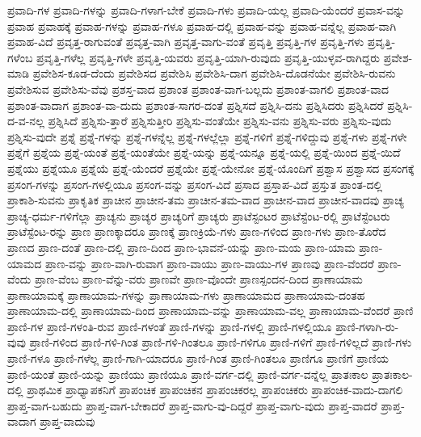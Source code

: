 {ಪ್ರವಾದಿ-ಗಳ
ಪ್ರವಾದಿ-ಗಳನ್ನು
ಪ್ರವಾದಿ-ಗಳಾಗ-ಬೇಕೆ
ಪ್ರವಾದಿ-ಗಳು
ಪ್ರವಾದಿ-ಯಲ್ಲ
ಪ್ರವಾದಿ-ಯೆಂದರೆ
ಪ್ರವಾಸ-ವನ್ನು
ಪ್ರವಾಹ
ಪ್ರವಾಹಕ್ಕೆ
ಪ್ರವಾಹ-ಗಳನ್ನು
ಪ್ರವಾಹ-ಗಳೂ
ಪ್ರವಾಹ-ದಲ್ಲಿ
ಪ್ರವಾಹ-ವನ್ನು
ಪ್ರವಾಹ-ವನ್ನೆಲ್ಲ
ಪ್ರವಾಹ-ವಾಗಿ
ಪ್ರವಾಹ-ವಿದೆ
ಪ್ರವೃತ್ತ-ರಾಗುವಂತೆ
ಪ್ರವೃತ್ತ-ವಾಗಿ
ಪ್ರವೃತ್ತ-ವಾಗು-ವಂತೆ
ಪ್ರವೃತ್ತಿ
ಪ್ರವೃತ್ತಿ-ಗಳ
ಪ್ರವೃತ್ತಿ-ಗಳು
ಪ್ರವೃತ್ತಿ-ಗಳೆಂಬ
ಪ್ರವೃತ್ತಿ-ಗಳೆಲ್ಲ
ಪ್ರವೃತ್ತಿ-ಗಳೇ
ಪ್ರವೃತ್ತಿ-ಯವರು
ಪ್ರವೃತ್ತಿ-ಯಾಗಿ-ರುವುದು
ಪ್ರವೃತ್ತಿ-ಯುಳ್ಳವ-ರಾಗಿದ್ದರು
ಪ್ರವೇಶ-ಮಾಡಿ
ಪ್ರವೇಶಿಸ-ಕೂಡ-ದೆಂದು
ಪ್ರವೇಶಿಸದ
ಪ್ರವೇಶಿಸಿ
ಪ್ರವೇಶಿಸಿ-ದಾಗ
ಪ್ರವೇಶಿಸಿ-ದೊಡನೆಯೇ
ಪ್ರವೇಶಿಸಿ-ರುವನು
ಪ್ರವೇಶಿಸುವ
ಪ್ರವೇಶಿಸು-ವೆವು
ಪ್ರಶಸ್ತ-ವಾದ
ಪ್ರಶಾಂತ
ಪ್ರಶಾಂತ-ವಾಗ-ಬಲ್ಲದು
ಪ್ರಶಾಂತ-ವಾಗಲಿ
ಪ್ರಶಾಂತ-ವಾದ
ಪ್ರಶಾಂತ-ವಾದಾಗ
ಪ್ರಶಾಂತ-ವಾ-ದುದು
ಪ್ರಶಾಂತ-ಸಾಗರ-ದಂತೆ
ಪ್ರಶ್ನಿಸದೆ
ಪ್ರಶ್ನಿಸಿ-ದನು
ಪ್ರಶ್ನಿಸಿದರು
ಪ್ರಶ್ನಿಸಿದರೆ
ಪ್ರಶ್ನಿಸಿ-ದ-ವ-ನಲ್ಲ
ಪ್ರಶ್ನಿಸಿದೆ
ಪ್ರಶ್ನಿಸು-ತ್ತಾರೆ
ಪ್ರಶ್ನಿಸುತ್ತೀರಿ
ಪ್ರಶ್ನಿಸು-ವಂತೆಯೇ
ಪ್ರಶ್ನಿಸು-ವನು
ಪ್ರಶ್ನಿಸು-ವರು
ಪ್ರಶ್ನಿಸು-ವುದು
ಪ್ರಶ್ನಿಸು-ವುದೇ
ಪ್ರಶ್ನೆ
ಪ್ರಶ್ನೆ-ಗಳನ್ನು
ಪ್ರಶ್ನೆ-ಗಳನ್ನೆಲ್ಲ
ಪ್ರಶ್ನೆ-ಗಳಲ್ಲೆಲ್ಲಾ
ಪ್ರಶ್ನೆ-ಗಳಿಗೆ
ಪ್ರಶ್ನೆ-ಗಳಿದ್ದುವು
ಪ್ರಶ್ನೆ-ಗಳು
ಪ್ರಶ್ನೆ-ಗಳೇ
ಪ್ರಶ್ನೆಗೆ
ಪ್ರಶ್ನೆಯ
ಪ್ರಶ್ನೆ-ಯಂತೆ
ಪ್ರಶ್ನೆ-ಯಂತೆಯೇ
ಪ್ರಶ್ನೆ-ಯನ್ನು
ಪ್ರಶ್ನೆ-ಯನ್ನೂ
ಪ್ರಶ್ನೆ-ಯಲ್ಲಿ
ಪ್ರಶ್ನೆ-ಯಿಂದ
ಪ್ರಶ್ನೆ-ಯಿದೆ
ಪ್ರಶ್ನೆಯು
ಪ್ರಶ್ನೆಯೂ
ಪ್ರಶ್ನೆಯೆ
ಪ್ರಶ್ನೆ-ಯೆಂದರೆ
ಪ್ರಶ್ನೆಯೇ
ಪ್ರಶ್ನೆ-ಯೇನೋ
ಪ್ರಶ್ನೆ-ಯೊಂದಿಗೆ
ಪ್ರಶ್ವಾಸ
ಪ್ರಶ್ವಾಸದ
ಪ್ರಸಂಗಕ್ಕೆ
ಪ್ರಸಂಗ-ಗಳನ್ನು
ಪ್ರಸಂಗ-ಗಳಲ್ಲಿಯೂ
ಪ್ರಸಂಗ-ವನ್ನು
ಪ್ರಸಂಗ-ವಿದೆ
ಪ್ರಸಾದ
ಪ್ರಸ್ತಾಪ-ವಿದೆ
ಪ್ರಸ್ತುತ
ಪ್ರಾಂತ-ದಲ್ಲಿ
ಪ್ರಾಕಾಶಿ-ಸುವನು
ಪ್ರಾಕೃತಿಕ
ಪ್ರಾಚೀನ
ಪ್ರಾಚೀನ-ತಮ
ಪ್ರಾಚೀನ-ತಮ-ವಾದ
ಪ್ರಾಚೀನ-ವಾದ
ಪ್ರಾಚೀನ-ವಾದವು
ಪ್ರಾಚ್ಯ
ಪ್ರಾಚ್ಯ-ಧರ್ಮ-ಗಳಿಗೆಲ್ಲಾ
ಪ್ರಾಚ್ಯನು
ಪ್ರಾಚ್ಯರ
ಪ್ರಾಚ್ಯರಿಗೆ
ಪ್ರಾಚ್ಯರು
ಪ್ರಾಟೆಸ್ಟಂಟರ
ಪ್ರಾಟೆಸ್ಟೆಂಟ-ರಲ್ಲಿ
ಪ್ರಾಟೆಸ್ಟೆಂಟರು
ಪ್ರಾಟೆಸ್ಟೆಂಟ-ರನ್ನು
ಪ್ರಾಣ
ಪ್ರಾಣಕ್ಕಾದರೂ
ಪ್ರಾಣಕ್ಕೆ
ಪ್ರಾಣಕ್ರಿಯೆ-ಗಳು
ಪ್ರಾಣ-ಗಳಿಂದ
ಪ್ರಾಣ-ಗಳು
ಪ್ರಾಣ-ತೊರೆದ
ಪ್ರಾಣದ
ಪ್ರಾಣ-ದಂತೆ
ಪ್ರಾಣ-ದಲ್ಲಿ
ಪ್ರಾಣ-ದಿಂದ
ಪ್ರಾಣ-ಭಾವನೆ-ಯನ್ನು
ಪ್ರಾಣ-ಮಯ
ಪ್ರಾಣ-ಯಾಮ
ಪ್ರಾಣ-ಯಾಮದ
ಪ್ರಾಣ-ವನ್ನು
ಪ್ರಾಣ-ವಾಗಿ-ರುವಾಗ
ಪ್ರಾಣ-ವಾಯು
ಪ್ರಾಣ-ವಾಯು-ಗಳ
ಪ್ರಾಣವು
ಪ್ರಾಣ-ವೆಂದರೆ
ಪ್ರಾಣ-ವೆಂದು
ಪ್ರಾಣ-ವೆಂಬ
ಪ್ರಾಣ-ವೆನ್ನು-ವರು
ಪ್ರಾಣವೇ
ಪ್ರಾಣ-ವೊಂದೇ
ಪ್ರಾಣಸ್ಪಂದನ-ದಿಂದ
ಪ್ರಾಣಾಯಾಮ
ಪ್ರಾಣಾಯಾಮಕ್ಕೆ
ಪ್ರಾಣಾಯಾಮ-ಗಳನ್ನು
ಪ್ರಾಣಾಯಾಮ-ಗಳು
ಪ್ರಾಣಾಯಾಮದ
ಪ್ರಾಣಾಯಾಮ-ದಂತಹ
ಪ್ರಾಣಾಯಾಮ-ದಲ್ಲಿ
ಪ್ರಾಣಾಯಾಮ-ದಿಂದ
ಪ್ರಾಣಾಯಾಮ-ವನ್ನು
ಪ್ರಾಣಾಯಾಮ-ವಲ್ಲ
ಪ್ರಾಣಾಯಾಮ-ವೆಂದರೆ
ಪ್ರಾಣಿ
ಪ್ರಾಣಿ-ಗಳ
ಪ್ರಾಣಿ-ಗಳಂತಿ-ರುವ
ಪ್ರಾಣಿ-ಗಳಂತೆ
ಪ್ರಾಣಿ-ಗಳನ್ನು
ಪ್ರಾಣಿ-ಗಳಲ್ಲಿ
ಪ್ರಾಣಿ-ಗಳಲ್ಲಿಯೂ
ಪ್ರಾಣಿ-ಗಳಾಗಿ-ರು-ವುವು
ಪ್ರಾಣಿ-ಗಳಿಂದ
ಪ್ರಾಣಿ-ಗಳಿ-ಗಿಂತ
ಪ್ರಾಣಿ-ಗಳಿ-ಗಿಂತಲೂ
ಪ್ರಾಣಿ-ಗಳಿಗೂ
ಪ್ರಾಣಿ-ಗಳಿಗೆ
ಪ್ರಾಣಿ-ಗಳಿಲ್ಲದೆ
ಪ್ರಾಣಿ-ಗಳು
ಪ್ರಾಣಿ-ಗಳೂ
ಪ್ರಾಣಿ-ಗಳೆಲ್ಲ
ಪ್ರಾಣಿ-ಗಾಗಿ-ಯಾದರೂ
ಪ್ರಾಣಿ-ಗಿಂತ
ಪ್ರಾಣಿ-ಗಿಂತಲೂ
ಪ್ರಾಣಿಗೂ
ಪ್ರಾಣಿಗೆ
ಪ್ರಾಣಿಯ
ಪ್ರಾಣಿ-ಯಂತೆ
ಪ್ರಾಣಿ-ಯನ್ನು
ಪ್ರಾಣಿಯು
ಪ್ರಾಣಿಯೂ
ಪ್ರಾಣಿ-ವರ್ಗ-ದಲ್ಲಿ
ಪ್ರಾಣಿ-ವರ್ಗ-ವನ್ನೆಲ್ಲ
ಪ್ರಾತಃಕಾಲ
ಪ್ರಾತಃಕಾಲ-ದಲ್ಲಿ
ಪ್ರಾಥಮಿಕ
ಪ್ರಾಧ್ಯಾಪಕನಿಗೆ
ಪ್ರಾಪಂಚಿಕ
ಪ್ರಾಪಂಚಿಕನ
ಪ್ರಾಪಂಚಿಕರಲ್ಲ
ಪ್ರಾಪಂಚಿಕರು
ಪ್ರಾಪಂಚಿಕ-ವಾದು-ದಾಗಲಿ
ಪ್ರಾಪ್ತ-ವಾಗ-ಬಹುದು
ಪ್ರಾಪ್ತ-ವಾಗ-ಬೇಕಾದರೆ
ಪ್ರಾಪ್ತ-ವಾಗು-ವು-ದಿದ್ದರೆ
ಪ್ರಾಪ್ತ-ವಾಗು-ವುದು
ಪ್ರಾಪ್ತ-ವಾದರೆ
ಪ್ರಾಪ್ತ-ವಾದಾಗ
ಪ್ರಾಪ್ತ-ವಾದುವು
}
